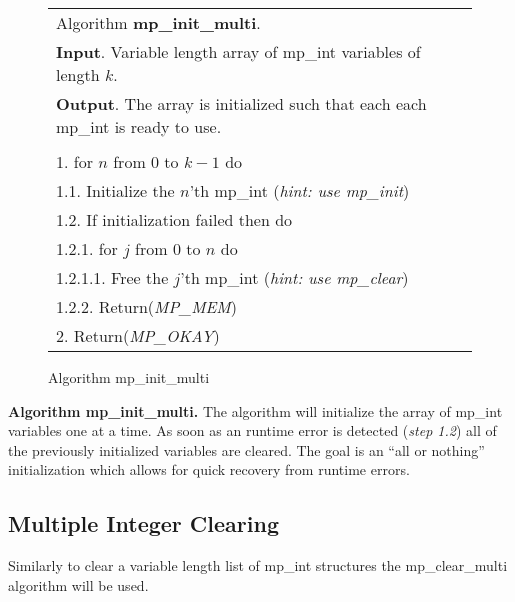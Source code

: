 \documentclass[b5paper]{book}
\begin{document}
\begin{figure}[here]
\begin{center}
\begin{tabular}{l}
\hline Algorithm \textbf{mp\_init\_multi}. \\
\textbf{Input}.   Variable length array of mp\_int variables of length $k$. \\
\textbf{Output}.  The array is initialized such that each each mp\_int is ready to use. \\
\hline \\
1.  for $n$ from 0 to $k - 1$ do \\
\hspace{+3mm}1.1.  Initialize the $n$'th mp\_int (\textit{hint: use mp\_init}) \\
\hspace{+3mm}1.2.  If initialization failed then do \\
\hspace{+6mm}1.2.1.  for $j$ from $0$ to $n$ do \\
\hspace{+9mm}1.2.1.1.  Free the $j$'th mp\_int (\textit{hint: use mp\_clear}) \\
\hspace{+6mm}1.2.2.   Return(\textit{MP\_MEM}) \\
2.  Return(\textit{MP\_OKAY}) \\
\hline
\end{tabular}
\end{center}
\caption{Algorithm mp\_init\_multi}
\end{figure}

\textbf{Algorithm mp\_init\_multi.}
The algorithm will initialize the array of mp\_int variables one at a time.  As soon as an runtime error is detected (\textit{step 1.2}) all of
the previously initialized variables are cleared.  The goal is an ``all or nothing'' initialization which allows for quick recovery from runtime 
errors.

\subsection{Multiple Integer Clearing}
Similarly to clear a variable length list of mp\_int structures the mp\_clear\_multi algorithm will be used.
\end{document}
